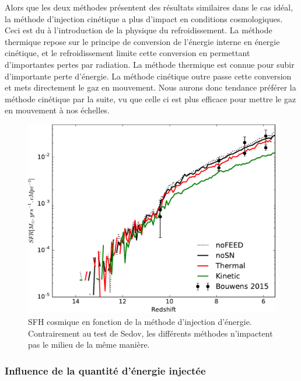 Alors que les deux méthodes présentent des résultats similaires dans le cas idéal, la méthode d'injection cinétique a plus d'impact en conditions cosmologiques.
Ceci est du à l'introduction de la physique du refroidissement.
La méthode thermique repose sur le principe de conversion de l'énergie interne en énergie cinétique, et le refroidissement limite cette conversion en permettant d'importantes pertes par radiation.
La méthode thermique est connue %
pour subir d'importante perte d'énergie.
La méthode cinétique outre passe cette conversion et mets directement le gaz en mouvement.
Nous aurons donc tendance préférer la méthode cinétique par la suite, vu que celle ci est plus efficace pour mettre le gaz en mouvement à nos échelles.


\begin{figure}
        \includegraphics[width=.95\textwidth]{img/03/sedov/SFRmethode.pdf} 
        \caption[SFH cosmique en fonction de la méthode d'injection d'énergie]{SFH cosmique en fonction de la méthode d'injection d'énergie.
        Contrairement au test de Sedov, les différents méthodes n'impactent pas le milieu de la même manière.
        }
 		\label{fig:sfr_methode}
\end{figure}



\subsubsection{Influence de la quantité d'énergie injectée}
\label{sec:snegy}

